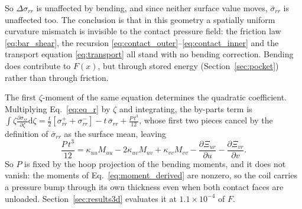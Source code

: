 \documentclass[11pt]{article}
\begin{document}
So $\Delta\sigma_{rr}$ is unaffected by bending, and since neither surface value
moves, $\bar\sigma_{rr}$ is unaffected too. The conclusion is that in this
geometry a spatially uniform curvature mismatch is invisible to the contact
pressure field: the friction law \eqref{eq:bar_shear}, the recursion
\eqref{eq:contact_outer}--\eqref{eq:contact_inner} and the transport equation
\eqref{eq:transport} all stand with no bending correction. Bending does
contribute to $F(x)$, but through stored energy
(Section~\ref{sec:pocket}) rather than through friction.

The first $\zeta$-moment of the same equation determines the quadratic
coefficient. Multiplying Eq.~\eqref{eq:eq_r} by $\zeta$ and integrating, the
by-parts term is
$\int\zeta\frac{\partial \sigma_{rr}}{\partial \zeta}\mathrm d\zeta
= \frac{t}{2}\left[\sigma_{rr}^{+}+\sigma_{rr}^{-}\right] - t\,\bar\sigma_{rr}
+ \frac{P\,t^{3}}{12}$, whose first two pieces cancel by the definition of
$\bar\sigma_{rr}$ as the surface mean, leaving
\begin{equation}\label{eq:P_from_rmoment}
    \boxed{\;\frac{P\,t^{3}}{12}
      = \kappa_{uu}M_{uu} - 2\kappa_{uv}M_{uv} + \kappa_{vv}M_{vv}
        - \frac{\partial \Xi_{ur}}{\partial u}
        - \frac{\partial \Xi_{vr}}{\partial v}.\;}
\end{equation}
So $P$ is fixed by the hoop projection of the bending moments, and it does not
vanish: the moments of Eq.~\eqref{eq:moment_derived} are nonzero, so the coil
carries a pressure bump through its own thickness even when both contact faces
are unloaded. Section~\ref{sec:results3d} evaluates it at $1.1\times10^{-4}$
of $F$.
\end{document}
